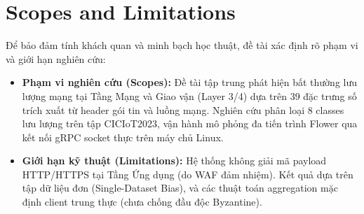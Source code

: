 \section{Scopes and Limitations}
\label{sec:intro_scopes_limitations}
Để bảo đảm tính khách quan và minh bạch học thuật, đề tài xác định rõ phạm vi và giới hạn nghiên cứu:
\begin{itemize}
    \item \textbf{Phạm vi nghiên cứu (Scopes):} Đề tài tập trung phát hiện bất thường lưu lượng mạng tại Tầng Mạng và Giao vận (Layer 3/4) dựa trên 39 đặc trưng số trích xuất từ header gói tin và luồng mạng. Nghiên cứu phân loại 8 classes lưu lượng trên tập CICIoT2023, vận hành mô phỏng đa tiến trình Flower qua kết nối gRPC socket thực trên máy chủ Linux.
    \item \textbf{Giới hạn kỹ thuật (Limitations):} Hệ thống không giải mã payload HTTP\slash HTTPS tại Tầng Ứng dụng (do WAF đảm nhiệm). Kết quả dựa trên tập dữ liệu đơn (Single-Dataset Bias), và các thuật toán aggregation mặc định client trung thực (chưa chống đầu độc Byzantine).
\end{itemize}

